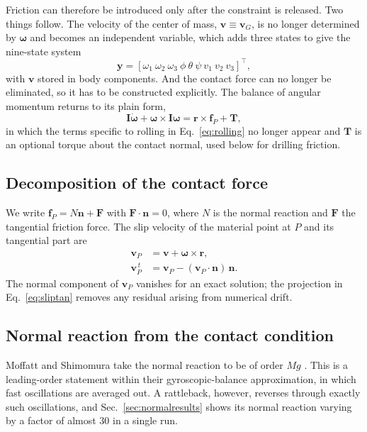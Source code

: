 \documentclass[aps,pre,twocolumn,superscriptaddress,amsmath,amssymb,floatfix,nofootinbib]{revtex4-2}
\newcommand{\rpg}{\bm{r}}
\newcommand{\ve}[1]{\bm{#1}}
\begin{document}
Friction can therefore be introduced only after the constraint is released. Two things
follow. The velocity of the center of mass, $\ve v\equiv\ve v_G$, is no longer
determined by $\bm\omega$ and becomes an independent variable, which adds three states
to give the nine-state system
\begin{equation}
\ve y=[\omega_1\ \omega_2\ \omega_3\ \phi\ \theta\ \psi\ v_1\ v_2\ v_3]^{\top},
\label{eq:state}
\end{equation}
with $\ve v$ stored in body components. And the contact force can no longer be
eliminated, so it has to be constructed explicitly. The balance of angular momentum
returns to its plain form,
\begin{equation}
\ve I\dot{\bm\omega}+\bm\omega\times\ve I\bm\omega=\rpg\times\ve f_P+\ve T,
\label{eq:amb}
\end{equation}
in which the terms specific to rolling in Eq.~\eqref{eq:rolling} no longer appear and
$\ve T$ is an optional torque about the contact normal, used below for drilling friction.

\subsection{Decomposition of the contact force}

We write $\ve f_P=N\ve n+\ve F$ with $\ve F\cdot\ve n=0$, where $N$ is the normal
reaction and $\ve F$ the tangential friction force. The slip velocity of the material
point at $P$ and its tangential part are
\begin{align}
\ve v_P&=\ve v+\bm\omega\times\rpg,\label{eq:slip}\\
\ve v_P^{\,t}&=\ve v_P-(\ve v_P\cdot\ve n)\,\ve n .\label{eq:sliptan}
\end{align}
The normal component of $\ve v_P$ vanishes for an exact solution; the projection in
Eq.~\eqref{eq:sliptan} removes any residual arising from numerical drift.

\subsection{Normal reaction from the contact condition}\label{sec:normal}

Moffatt and Shimomura take the normal reaction to be of order $Mg$ \cite{Moffatt2002}.
This is a leading-order statement within their gyroscopic-balance approximation, in which
fast oscillations are averaged out. A rattleback, however, reverses through exactly such
oscillations, and Sec.~\ref{sec:normalresults} shows its normal reaction varying by a
factor of almost $30$ in a single run.
\end{document}
